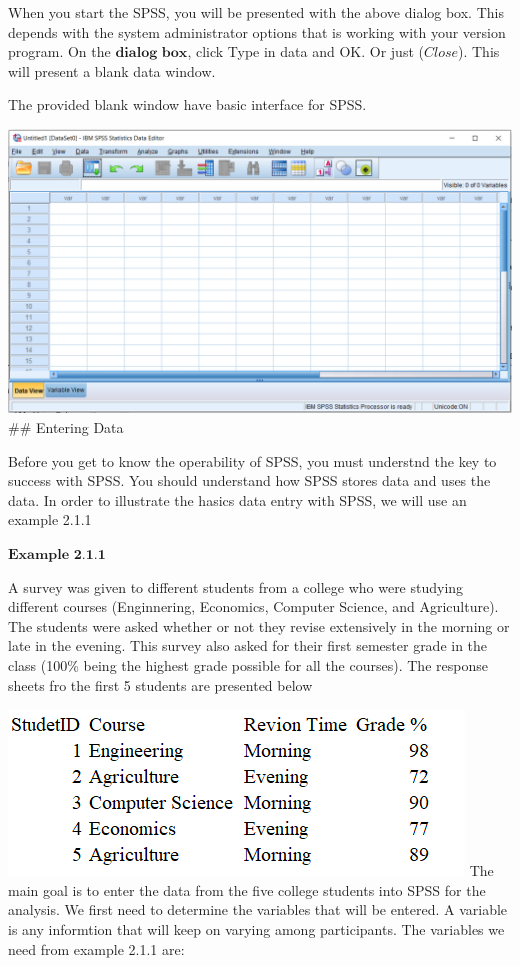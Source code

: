 \documentclass[
]{book}
\begin{document}
When you start the SPSS, you will be presented with the above dialog box. This depends with the system administrator options that is working with your version program. On the \(\textbf{dialog box}\), click Type in data and OK. Or just (\(\textit{Close}\)). This will present a blank data window.

The provided blank window have basic interface for SPSS.

\includegraphics{blankwindow.png}
\#\# Entering Data

Before you get to know the operability of SPSS, you must understnd the key to success with SPSS. You should understand how SPSS stores data and uses the data. In order to illustrate the hasics data entry with SPSS, we will use an example 2.1.1

\(\textbf{Example 2.1.1}\)

A survey was given to different students from a college who were studying different courses (Enginnering, Economics, Computer Science, and Agriculture). The students were asked whether or not they revise extensively in the morning or late in the evening. This survey also asked for their first semester grade in the class (100\% being the highest grade possible for all the courses). The response sheets fro the first 5 students are presented below

\includegraphics{Exampe211.png}
The main goal is to enter the data from the five college students into SPSS for the analysis. We first need to determine the variables that will be entered. A variable is any informtion that will keep on varying among participants. The variables we need from example 2.1.1 are:
\end{document}
